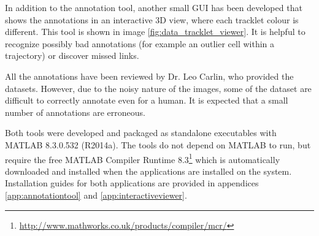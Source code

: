 		In addition to the annotation tool, another small GUI has been developed that shows the annotations in an interactive 3D view, where each tracklet colour is different. This tool is shown in image \cref{fig:data_tracklet_viewer}. It is helpful to recognize possibly bad annotations (for example an outlier cell within a trajectory) or discover missed links.
		
		All the annotations have been reviewed by Dr. Leo Carlin, who provided the datasets. However, due to the noisy nature of the images, some of the dataset are difficult to correctly annotate even for a human. It is expected that a small number of annotations are erroneous.
		
		Both tools were developed and packaged as standalone executables with MATLAB 8.3.0.532 (R2014a). The tools do not depend on MATLAB to run, but require the free MATLAB Compiler Runtime 8.3\footnote{\url{http://www.mathworks.co.uk/products/compiler/mcr/}} which is automatically downloaded and installed when the applications are installed on the system. Installation guides for both applications are provided in appendices \ref{app:annotationtool} and \ref{app:interactiveviewer}.